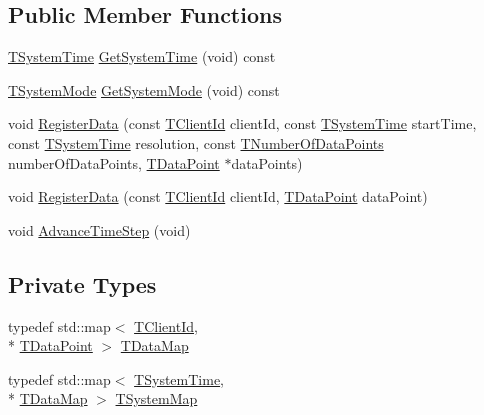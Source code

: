 \subsection*{Public Member Functions}
\begin{DoxyCompactItemize}
\item 
\hyperlink{class_system_manager_a9743ff4f23e7d957f5932780d8070099}{T\-System\-Time} \hyperlink{class_system_manager_aebfc7fab136f01836e07228474e4326f}{Get\-System\-Time} (void) const 
\item 
\hyperlink{class_system_manager_aa32b3f50b8882c8aa7a9ca88ab7a43dd}{T\-System\-Mode} \hyperlink{class_system_manager_ab9f52e613fdbdc4690be79179b7357e6}{Get\-System\-Mode} (void) const 
\item 
void \hyperlink{class_system_manager_abaf36dbd2e75a773f2ddc40ac82e5f3b}{Register\-Data} (const \hyperlink{class_system_manager_af957fc0ff78c4c38085c26ac0d81064e}{T\-Client\-Id} client\-Id, const \hyperlink{class_system_manager_a9743ff4f23e7d957f5932780d8070099}{T\-System\-Time} start\-Time, const \hyperlink{class_system_manager_a9743ff4f23e7d957f5932780d8070099}{T\-System\-Time} resolution, const \hyperlink{class_system_manager_a9cb6753ad6cd26b6ad46c194f38bee77}{T\-Number\-Of\-Data\-Points} number\-Of\-Data\-Points, \hyperlink{class_system_manager_a177b09f79bd2cef44160fb4d8ea77996}{T\-Data\-Point} $\ast$data\-Points)
\item 
void \hyperlink{class_system_manager_ae96634f0635ad6c5e98620eb70ef7fbe}{Register\-Data} (const \hyperlink{class_system_manager_af957fc0ff78c4c38085c26ac0d81064e}{T\-Client\-Id} client\-Id, \hyperlink{class_system_manager_a177b09f79bd2cef44160fb4d8ea77996}{T\-Data\-Point} data\-Point)
\item 
void \hyperlink{class_system_manager_a87443d7e75b0f170535d315c27237253}{Advance\-Time\-Step} (void)
\end{DoxyCompactItemize}
\subsection*{Private Types}
\begin{DoxyCompactItemize}
\item 
typedef std\-::map$<$ \hyperlink{class_system_manager_af957fc0ff78c4c38085c26ac0d81064e}{T\-Client\-Id}, \\*
\hyperlink{class_system_manager_a177b09f79bd2cef44160fb4d8ea77996}{T\-Data\-Point} $>$ \hyperlink{class_system_manager_ac003793cd03c1af317bf30b11e8c0a5a}{T\-Data\-Map}
\item 
typedef std\-::map$<$ \hyperlink{class_system_manager_a9743ff4f23e7d957f5932780d8070099}{T\-System\-Time}, \\*
\hyperlink{class_system_manager_ac003793cd03c1af317bf30b11e8c0a5a}{T\-Data\-Map} $>$ \hyperlink{class_system_manager_aae66953e62823ae14519c7e9b3925864}{T\-System\-Map}
\end{DoxyCompactItemize}
